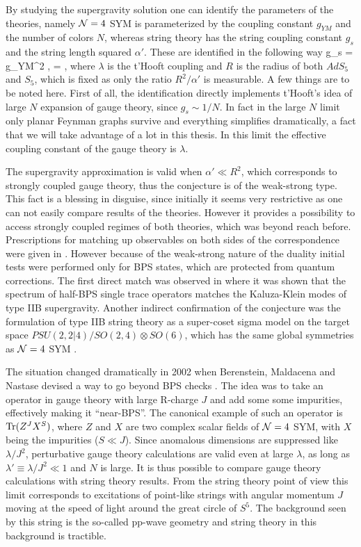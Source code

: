 By studying the supergravity solution one can identify the parameters of the theories, namely $\mathcal{N}=4$ SYM is parameterized by the coupling constant $g_{YM}$ and the number of colors $N$, whereas string theory has the string coupling constant $g_s$ and the string length squared $\alpha'$. 
These are identified in the following way
\pi g_s = g_{YM}^2 \equiv {}, \;\;\;\;\;\;\;  = \lambda,
\eeq
where $\lambda$ is the t'Hooft coupling and $R$ is the radius of both $AdS_5$ and $S_5$, which is fixed as only the ratio $R^2/\alpha'$ is measurable.
A few things are to be noted here. First of all, the identification directly implements t'Hooft's idea of large $N$ expansion of gauge theory, since $g_s \sim 1/N$. 
In fact in the large $N$ limit only planar Feynman graphs survive and everything simplifies dramatically, a fact that we will take advantage of a lot in this thesis.
In this limit the effective coupling constant of the gauge theory is $\lambda$. 

The supergravity approximation is valid when $\alpha' \ll R^2$, which corresponds to strongly coupled gauge theory, thus the conjecture is of the weak-strong type. 
This fact is a blessing in disguise, since initially it seems very restrictive as one can not easily compare results of the theories. 
However it provides a possibility to access strongly coupled regimes of both theories, which was beyond reach before. 
Prescriptions for matching up observables on both sides of the correspondence were given in \cite{Gubser:1998bc, Witten:1998qj}. 
However because of the weak-strong nature of the duality initial tests were performed only for BPS states, which are protected from quantum corrections.
The first direct match was observed in \cite{Witten:1998qj} where it was shown that the spectrum of half-BPS single trace operators matches the Kaluza-Klein modes of type IIB supergravity.
Another indirect confirmation of the conjecture was the formulation of type IIB string theory as a super-coset sigma model on the target space $PSU(2,2|4) / SO(2,4) \otimes SO(6)$, which has the same global symmetries as $\mathcal{N}=4$ SYM \cite{Metsaev:1998it}.

The situation changed dramatically in 2002 when Berenstein, Maldacena and Nastase devised a way to go beyond BPS checks \cite{Berenstein:2002jq}. 
The idea was to take an operator in gauge theory with large R-charge $J$ and add some some impurities, effectively making it ``near-BPS''.
The canonical example of such an operator is $\mathrm{Tr}(Z^J X^S)$, where $Z$ and $X$ are two complex scalar fields of $\mathcal{N}=4$ SYM, with $X$ being the impurities ($S \ll J$).
Since anomalous dimensions are suppressed like $\lambda/J^2$, perturbative gauge theory calculations are valid even at large $\lambda$, as long as $\lambda' \equiv \lambda / J^2 \ll 1$ and $N$ is large.
It is thus possible to compare gauge theory calculations with string theory results.
From the string theory point of view this limit corresponds to excitations of point-like strings with angular momentum $J$ moving at the speed of light around the great circle of $S^5$. 
The background seen by this string is the so-called pp-wave geometry and string theory in this background is tractible.

